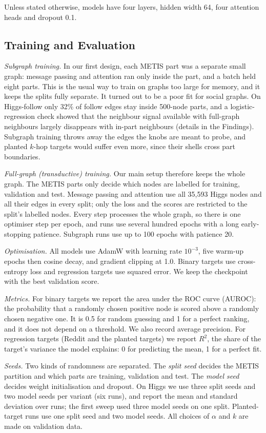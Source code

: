 Unless stated otherwise, models have four layers, hidden width 64, four attention heads and dropout 0.1.

\subsection{Training and Evaluation}
\textit{Subgraph training.} In our first design, each METIS part was a separate small graph: message passing and attention ran only inside the part, and a batch held eight parts. This is the usual way to train on graphs too large for memory, and it keeps the splits fully separate. It turned out to be a poor fit for social graphs. On Higgs-follow only 32\% of follow edges stay inside 500-node parts, and a logistic-regression check showed that the neighbour signal available with full-graph neighbours largely disappears with in-part neighbours (details in the Findings). Subgraph training throws away the edges the knobs are meant to probe, and planted $k$-hop targets would suffer even more, since their shells cross part boundaries.

\textit{Full-graph (transductive) training.} Our main setup therefore keeps the whole graph. The METIS parts only decide which nodes are labelled for training, validation and test. Message passing and attention use all 35,593 Higgs nodes and all their edges in every split; only the loss and the scores are restricted to the split's labelled nodes. Every step processes the whole graph, so there is one optimiser step per epoch, and runs use several hundred epochs with a long early-stopping patience. Subgraph runs use up to 100 epochs with patience 20.

\textit{Optimisation.} All models use AdamW \citep{loshchilov2019} with learning rate $10^{-3}$, five warm-up epochs then cosine decay, and gradient clipping at 1.0. Binary targets use cross-entropy loss and regression targets use squared error. We keep the checkpoint with the best validation score.

\textit{Metrics.} For binary targets we report the area under the ROC curve (AUROC): the probability that a randomly chosen positive node is scored above a randomly chosen negative one. It is 0.5 for random guessing and 1 for a perfect ranking, and it does not depend on a threshold. We also record average precision. For regression targets (Reddit and the planted targets) we report $R^2$, the share of the target's variance the model explains: 0 for predicting the mean, 1 for a perfect fit.

\textit{Seeds.} Two kinds of randomness are separated. The \emph{split seed} decides the METIS partition and which parts are training, validation and test. The \emph{model seed} decides weight initialisation and dropout. On Higgs we use three split seeds and two model seeds per variant (six runs), and report the mean and standard deviation over runs; the first sweep used three model seeds on one split. Planted-target runs use one split seed and two model seeds. All choices of $\alpha$ and $k$ are made on validation data.

